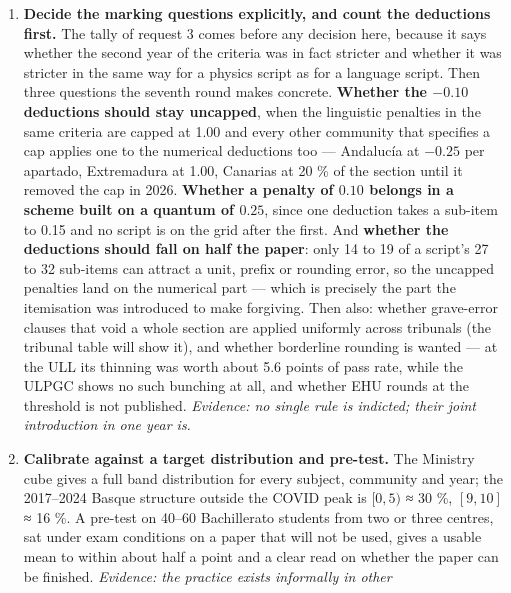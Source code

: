 \documentclass[
  10.5pt,
  a4paper,
  DIV=11,
  numbers=noendperiod]{scrartcl}
\begin{document}
\begin{enumerate}
  \emph{Evidence: n = 1 --- and the count of axes is four on this
  study's own coding, three on an earlier one --- which is why it sits
  seventh rather than first despite being the most plausible
  recommendation in the list. 2028 is the year the model is to be fully
  deployed.}
\item
  \textbf{Decide the marking questions explicitly, and count the
  deductions first.} The tally of request 3 comes before any decision
  here, because it says whether the second year of the criteria was in
  fact stricter and whether it was stricter in the same way for a
  physics script as for a language script. Then three questions the
  seventh round makes concrete. \textbf{Whether the \(-0.10\) deductions
  should stay uncapped}, when the linguistic penalties in the same
  criteria are capped at 1.00 and every other community that specifies a
  cap applies one to the numerical deductions too --- Andalucía at
  \(-0.25\) per apartado, Extremadura at 1.00, Canarias at 20 \% of the
  section until it removed the cap in 2026. \textbf{Whether a penalty of
  \(0.10\) belongs in a scheme built on a quantum of \(0.25\)}, since
  one deduction takes a sub-item to 0.15 and no script is on the grid
  after the first. And \textbf{whether the deductions should fall on
  half the paper}: only 14 to 19 of a script's 27 to 32 sub-items can
  attract a unit, prefix or rounding error, so the uncapped penalties
  land on the numerical part --- which is precisely the part the
  itemisation was introduced to make forgiving. Then also: whether
  grave-error clauses that void a whole section are applied uniformly
  across tribunals (the tribunal table will show it), and whether
  borderline rounding is wanted --- at the ULL its thinning was worth
  about 5.6 points of pass rate, while the ULPGC shows no such bunching
  at all, and whether EHU rounds at the threshold is not published.
  \emph{Evidence: no single rule is indicted; their joint introduction
  in one year is.}
\item
  \textbf{Calibrate against a target distribution and pre-test.} The
  Ministry cube gives a full band distribution for every subject,
  community and year; the 2017--2024 Basque structure outside the COVID
  peak is \([0,5)\) ≈ 30 \%, \([9,10]\) ≈ 16 \%. A pre-test on 40--60
  Bachillerato students from two or three centres, sat under exam
  conditions on a paper that will not be used, gives a usable mean to
  within about half a point and a clear read on whether the paper can be
  finished. \emph{Evidence: the practice exists informally in other
}
\end{enumerate}
\end{document}
